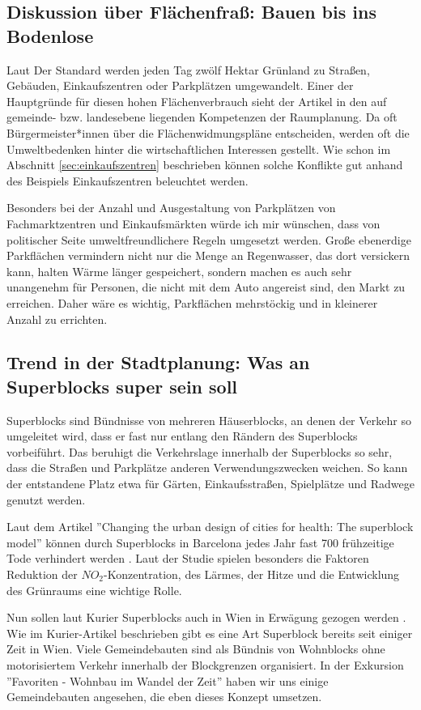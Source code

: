 \documentclass[]{article}
\begin{document}
\subsection{Diskussion über Flächenfraß: Bauen bis ins Bodenlose}
Laut Der Standard werden jeden Tag zwölf Hektar Grünland zu Straßen, Gebäuden, Einkaufszentren oder Parkplätzen umgewandelt.\cite{bauen_bis_ins_bodenlose} Einer der Hauptgründe für diesen hohen Flächenverbrauch sieht der Artikel in den auf gemeinde- bzw. landesebene liegenden Kompetenzen der Raumplanung. Da oft Bürgermeister*innen über die Flächenwidmungspläne entscheiden, werden oft die Umweltbedenken hinter die wirtschaftlichen Interessen gestellt. Wie schon im Abschnitt \ref{sec:einkaufszentren} beschrieben können solche Konflikte gut anhand des Beispiels Einkaufszentren beleuchtet werden.

Besonders bei der Anzahl und Ausgestaltung von Parkplätzen von Fachmarktzentren und Einkaufsmärkten würde ich mir wünschen, dass von politischer Seite umweltfreundlichere Regeln umgesetzt werden. Große ebenerdige Parkflächen vermindern nicht nur die Menge an Regenwasser, das dort versickern kann, halten Wärme länger gespeichert, sondern machen es auch sehr unangenehm für Personen, die nicht mit dem Auto angereist sind, den Markt zu erreichen. Daher wäre es wichtig, Parkflächen mehrstöckig und in kleinerer Anzahl zu errichten.

\subsection{Trend in der Stadtplanung: Was an Superblocks super sein soll}
Superblocks sind Bündnisse von mehreren Häuserblocks, an denen der Verkehr so umgeleitet wird, dass er fast nur entlang den Rändern des Superblocks vorbeiführt. Das beruhigt die Verkehrslage innerhalb der Superblocks so sehr, dass die Straßen und Parkplätze anderen Verwendungszwecken weichen. So kann der entstandene Platz etwa für Gärten, Einkaufsstraßen, Spielplätze und Radwege genutzt werden.

Laut dem Artikel ''Changing the urban design of cities for health: The superblock model'' können durch Superblocks in Barcelona jedes Jahr fast 700 frühzeitige Tode verhindert werden \cite{superblock_barcelona}. Laut der Studie spielen besonders die Faktoren Reduktion der $NO_2$-Konzentration, des Lärmes, der Hitze und die Entwicklung des Grünraums eine wichtige Rolle.

Nun sollen laut Kurier Superblocks auch in Wien in Erwägung gezogen werden \cite{superblocks_wien}. Wie im Kurier-Artikel beschrieben gibt es eine Art Superblock bereits seit einiger Zeit in Wien. Viele Gemeindebauten sind als Bündnis von Wohnblocks ohne motorisiertem Verkehr innerhalb der Blockgrenzen organisiert. In der Exkursion ''Favoriten - Wohnbau im Wandel der Zeit'' haben wir uns einige Gemeindebauten angesehen, die eben dieses Konzept umsetzen.
\end{document}
